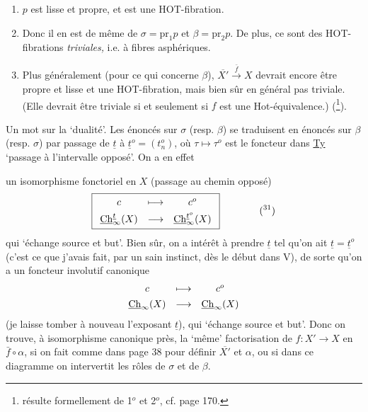 \begin{enumerate}[label={}, leftmargin=*]
\item[1$^o$)] $p$ est lisse et propre, et est une HOT-fibration.

\item[2$^o$)] Donc il en est de même de $\sigma=\mathrm{pr}_1p$ et $\beta=\mathrm{pr}_2p$. De plus, ce sont des HOT-fibrations \textit{triviales,} i.e. à fibres asphériques.


\item[3$^o$)] Plus généralement (pour ce qui concerne $\beta$), $\overline{X'}\xrightarrow{\ \bar{f}\ }X$ devrait encore être propre et lisse et une HOT-fibration, mais bien sûr en général pas triviale. (Elle devrait être triviale si et seulement si $f$ est une Hot-équivalence.) (\footnote[30]{résulte formellement de 1$^o$ et 2$^o$, cf. page 170.}).
\end{enumerate}

Un mot sur la `dualité'. Les énoncés sur $\sigma$ (resp. $\beta$) se traduisent en énoncés sur $\beta$ (resp. $\sigma$) par passage de $\underline{t}$ à $\underline{t}^o=(t^o_n)$, où $\tau\longmapsto\tau^o$ est le foncteur dans \underline{Ty} `passage à l'intervalle opposé'. On a en effet %


un isomorphisme fonctoriel en $X$ (passage au chemin opposé)
\[
\boxed{\begin{array}{ccc}
c & \longmapsto & c^o\\[4pt]
\uCh^{\underline{t}}_\infty(X) & \longrightarrow & \uCh^{\underline{t}^o}_\infty(X)
\end{array}}
\qquad\qquad
\text{(\footnotemark[31])}
\]
qui `échange source et but'. Bien sûr, on a intérêt à prendre $\underline{t}$ tel qu'on ait $\underline{t}=\underline{t}^o$ (c'est ce que j'avais fait, par un sain instinct, dès le début dans V), de sorte qu'on a un foncteur involutif canonique
\[
\begin{array}{ccc}
c & \longmapsto & c^o\\[4pt]
\underline{\mathrm{Ch}}_\infty(X) & \longrightarrow & \underline{\mathrm{Ch}}_\infty(X)
\end{array}
\]
(je laisse tomber à nouveau l'exposant $\underline{t}$), qui `échange source et but'. Donc on trouve, à isomorphisme canonique près, la `même' factorisation de $f:X'\longrightarrow X$ en $\bar{f}\circ\alpha$, si on fait comme dans page 38 pour définir $\overline{X'}$ et $\alpha$, ou si dans ce diagramme on intervertit les rôles de $\sigma$ et de $\beta$. %

